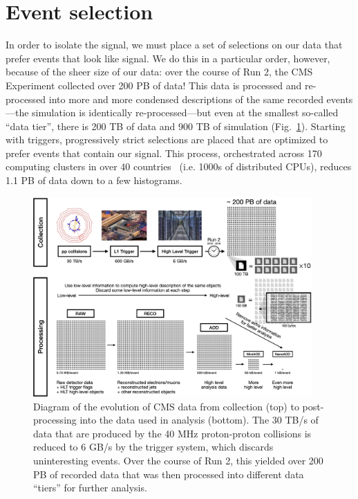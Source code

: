 \section{Event selection}
In order to isolate the signal, we must place a set of selections on our data that prefer events that look like signal. 
We do this in a particular order, however, because of the sheer size of our data: over the course of Run 2, the CMS Experiment collected over 200 PB of data! 
This data is processed and re-processed into more and more condensed descriptions of the same recorded events---the simulation is identically re-processed---but even at the smallest so-called ``data tier'', there is 200 TB of data and 900 TB of simulation (Fig.~\ref{fig:pp_to_nano}). 
Starting with triggers, progressively strict selections are placed that are optimized to prefer events that contain our signal. 
This process, orchestrated across 170 computing clusters in over 40 countries~\cite{WLCGWeb} (i.e. 1000s of distributed CPUs), reduces 1.1 PB of data down to a few histograms. 

\begin{figure}[htb]
    \centering
    \includegraphics[width=0.95\textwidth]{fig/cms/pp_to_nano.png}
    \caption[Diagram of the evolution of CMS data from collection to post-processing into the data used in analysis.]{
        Diagram of the evolution of CMS data from collection (top) to post-processing into the data used in analysis (bottom). 
        The 30 TB/s of data that are produced by the 40 MHz proton-proton collisions is reduced to 6 GB/s by the trigger system, which discards uninteresting events. 
        Over the course of Run 2, this yielded over 200 PB of recorded data that was then processed into different data ``tiers'' for further analysis. 
    }
    \label{fig:pp_to_nano}
\end{figure}

